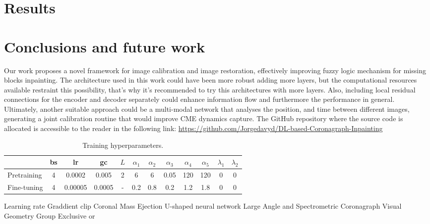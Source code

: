 \documentclass[draft]{agujournal2019}
\begin{document}
\section{Results}


\section{Conclusions and future work}
Our work proposes a novel framework for image calibration and image restoration, effectively improving fuzzy logic mechanism for missing blocks inpainting. The architecture used in this work could have been more robust adding more layers, but the computational resources available restraint this possibility, that's why it's recommended to try this architectures with more layers. Also, including local residual connections for the encoder and decoder separately could enhance information flow and furthermore the performance in general. Ultimately, another suitable approach could be a multi-modal network that analyses the position, and time between different images, generating a joint calibration routine that would improve CME dynamics capture. The GitHub repository where the source code is allocated is accessible to the reader in the following link: \url{https://github.com/Jorgedavyd/DL-based-Coronagraph-Inpainting}

\begin{table}
 \caption{Training hyperparameters.}
 \label{tab: example}
 \centering
 \begin{tabular}{l c c c c c c c c c c c}
 \hline
    & bs& lr & gc & $L$ & $\alpha_1$ & $\alpha_2$ & $\alpha_3$ & $\alpha_4$ & $\alpha_5$ & $\lambda_1$ & $\lambda_2$  \\
 \hline
   Pretraining  & 4 & 0.0002 & 0.005 & 2 & 6 & 6 & 0.05 & 120 & 120 & 0 & 0 \\
   Fine-tuning  & 4 & 0.00005 & 0.0005 & - & 0.2 & 0.8 & 0.2 & 1.2 & 1.8 & 0 & 0   \\
 \hline
 \end{tabular}
 \end{table}
\begin{acronyms}
Learning rate
Graddient clip
Coronal Mass Ejection
U-shaped neural network
Large Angle and Spectrometric Coronagraph
Visual Geometry Group
Exclusive or
\end{acronyms}
\end{document}
